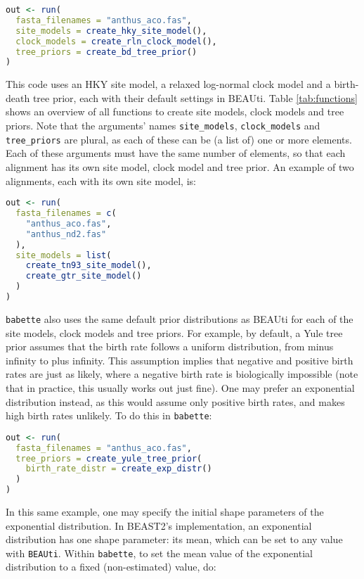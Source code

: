 \documentclass{article}
\begin{document}
\begin{lstlisting}[language=R, floatplacement=H]
out <- run(
  fasta_filenames = "anthus_aco.fas",
  site_models = create_hky_site_model(),
  clock_models = create_rln_clock_model(),
  tree_priors = create_bd_tree_prior()
)
\end{lstlisting}
This code uses an HKY site model, a relaxed log-normal clock model and a 
birth-death tree prior, each with their default settings in BEAUti.
Table \ref{tab:functions} shows an overview of all functions to 
create site models, clock models and tree priors.
Note that the arguments' names \verb;site_models;, \verb;clock_models; 
and \verb;tree_priors; are plural, as each of these
can be (a list of) one or more elements. Each of these arguments must 
have the same number of elements, so that each alignment has its
own site model, clock model and tree prior. 
An example of two alignments, each with its own site model, is:

\begin{lstlisting}[language=R, floatplacement=H]
out <- run(
  fasta_filenames = c(
    "anthus_aco.fas", 
    "anthus_nd2.fas"
  ),
  site_models = list(
    create_tn93_site_model(), 
    create_gtr_site_model()
  )
)
\end{lstlisting}
\verb;babette; also uses the same default prior distributions as BEAUti 
for each of the site models, clock models and tree priors. 
For example, by default, a Yule tree prior assumes that the birth rate 
follows a uniform distribution, 
from minus infinity to plus infinity. 
This assumption implies that negative and positive birth rates are just as likely, 
where a negative birth rate is biologically impossible (note that 
in practice, this usually works out just fine).
One may prefer an exponential distribution instead, 
as this would assume only positive birth rates, 
and makes high birth rates unlikely.
To do this in \verb;babette;:

\begin{lstlisting}[language=R, floatplacement=H]
out <- run(
  fasta_filenames = "anthus_aco.fas",
  tree_priors = create_yule_tree_prior(
    birth_rate_distr = create_exp_distr()    
  )
)
\end{lstlisting}
In this same example, one may specify
the initial shape parameters of the exponential distribution.
In BEAST2's implementation, an exponential distribution 
has one shape parameter: its mean, which can be set to any
value with \verb;BEAUti;. Within \verb;babette;, to set the 
mean value of the exponential distribution to a 
fixed (non-estimated) value, do: 
\end{document}
